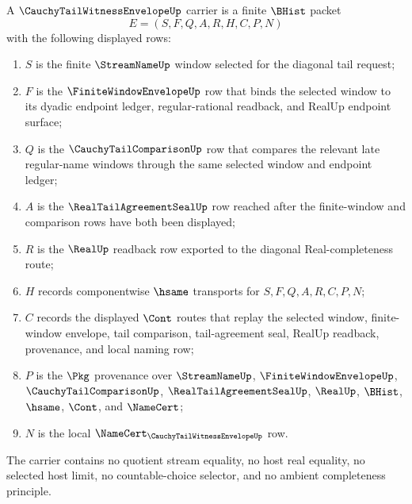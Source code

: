\begin{definition}
\label{def:cauchy-tail-witness-envelope-carrier}
A $\CauchyTailWitnessEnvelopeUp$ carrier is a finite $\BHist$ packet
$$
E=(S,F,Q,A,R,H,C,P,N)
$$
with the following displayed rows:
\begin{enumerate}
\item $S$ is the finite $\StreamNameUp$ window selected for the diagonal tail request;
\item $F$ is the $\FiniteWindowEnvelopeUp$ row that binds the selected window to its dyadic endpoint ledger, regular-rational readback, and RealUp endpoint surface;
\item $Q$ is the $\CauchyTailComparisonUp$ row that compares the relevant late regular-name windows through the same selected window and endpoint ledger;
\item $A$ is the $\RealTailAgreementSealUp$ row reached after the finite-window and comparison rows have both been displayed;
\item $R$ is the $\RealUp$ readback row exported to the diagonal Real-completeness route;
\item $H$ records componentwise $\hsame$ transports for $S,F,Q,A,R,C,P,N$;
\item $C$ records the displayed $\Cont$ routes that replay the selected window, finite-window envelope, tail comparison, tail-agreement seal, RealUp readback, provenance, and local naming row;
\item $P$ is the $\Pkg$ provenance over $\StreamNameUp$, $\FiniteWindowEnvelopeUp$, $\CauchyTailComparisonUp$, $\RealTailAgreementSealUp$, $\RealUp$, $\BHist$, $\hsame$, $\Cont$, and $\NameCert$;
\item $N$ is the local $\NameCert_{\CauchyTailWitnessEnvelopeUp}$ row.
\end{enumerate}
The carrier contains no quotient stream equality, no host real equality, no selected host limit, no countable-choice selector, and no ambient completeness principle.
\end{definition}


